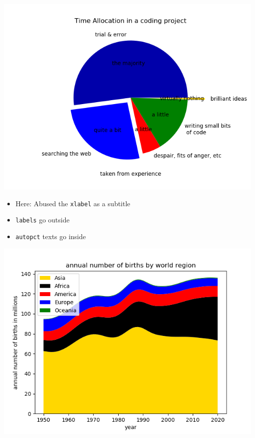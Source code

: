 
\begin{frame}
%
\begin{tcolorbox}[title=Output: Pie Charts (Augmented)]
	\begin{minipage}{.7\linewidth}
	\includegraphics[width=\linewidth]{./gfx/plt-pie-args}
	\end{minipage}
	\begin{minipage}{.25\linewidth}
	\begin{itemize}
	\item Here: Abused the \texttt{xlabel} as a subtitle
	\item \texttt{labels} go outside
	\item \texttt{autopct} texts go inside
	\end{itemize}
	\end{minipage}
\end{tcolorbox}
%
\end{frame}


\begin{frame}
%
\begin{tcolorbox}[title=Next Goal: Stacked Plots]
\begin{center}
	\includegraphics[width=.7\linewidth]{./gfx/plt-stackplot}
\end{center}
\end{tcolorbox}
%
\end{frame}

